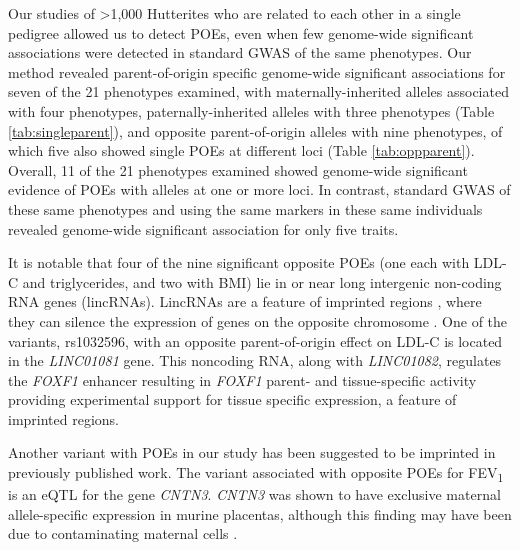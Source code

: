 Our studies of \textgreater1,000 Hutterites who are related to each other in a single pedigree allowed us to detect POEs, even when few genome-wide significant associations were detected in standard GWAS of the same phenotypes. Our method revealed parent-of-origin specific genome-wide significant associations for seven of the 21 phenotypes examined, with maternally-inherited alleles associated with four phenotypes, paternally-inherited alleles with three phenotypes (Table \ref{tab:singleparent}), and opposite parent-of-origin alleles with nine phenotypes, of which five also showed single POEs at different loci (Table \ref{tab:oppparent}). Overall, 11 of the 21 phenotypes examined showed genome-wide significant evidence of POEs with alleles at one or more loci. In contrast, standard GWAS of these same phenotypes and using the same markers in these same individuals revealed genome-wide significant association for only five traits. 

It is notable that four of the nine significant opposite POEs (one each with LDL-C and triglycerides, and two with BMI) lie in or near long intergenic non-coding RNA genes (lincRNAs). LincRNAs are a feature of imprinted regions \cite{Peters2014}, where they can silence the expression of genes on the opposite chromosome \cite{Barlow:2014dv,Patten:2016cb}. One of the variants, rs1032596, with an opposite parent-of-origin effect on LDL-C is located in the \emph{LINC01081} gene. This noncoding RNA, along with \emph{LINC01082}, regulates the \emph{FOXF1} enhancer resulting in \emph{FOXF1} parent- and tissue-specific activity\cite{Szafranski:2016fz} providing experimental support for tissue specific expression, a feature of imprinted regions. 

Another variant with POEs in our study has been suggested to be imprinted in previously published work. The variant associated with opposite POEs for FEV\textsubscript{1} is an eQTL for the gene \emph{CNTN3}. \emph{CNTN3} was shown to have exclusive maternal allele-specific expression in murine placentas\cite{Brideau:2010gz}, although this finding may have been due to contaminating maternal cells \cite{Okae:2011hj,Proudhon:2011eh}. 

